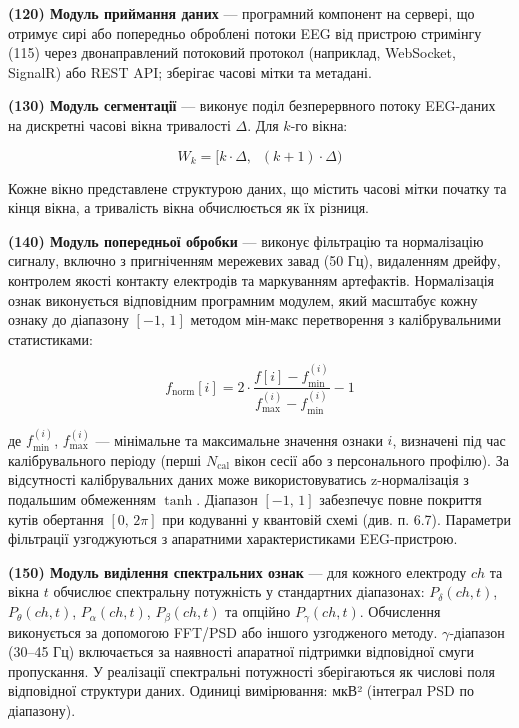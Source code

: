 \documentclass[12pt,a4paper]{article}
\begin{document}
\textbf{(120) Модуль приймання даних} --- програмний компонент на сервері, що отримує сирі або попередньо оброблені потоки EEG від пристрою стримінгу (115) через двонаправлений потоковий протокол (наприклад, WebSocket, SignalR) або REST API; зберігає часові мітки та метадані.



\textbf{(130) Модуль сегментації} --- виконує поділ безперервного потоку EEG-даних на дискретні часові вікна тривалості \(\Delta\). Для \(k\)-го вікна:



\[W_k = \bigl[k \cdot \Delta,\;\;(k+1) \cdot \Delta\bigr)\]



Кожне вікно представлене структурою даних, що містить часові мітки початку та кінця вікна, а тривалість вікна обчислюється як їх різниця.



\textbf{(140) Модуль попередньої обробки} --- виконує фільтрацію та нормалізацію сигналу, включно з пригніченням мережевих завад (50 Гц), видаленням дрейфу, контролем якості контакту електродів та маркуванням артефактів. Нормалізація ознак виконується відповідним програмним модулем, який масштабує кожну ознаку до діапазону \([-1,\,1]\) методом мін-макс перетворення з калібрувальними статистиками:



\[f_{\text{norm}}[i] = 2 \cdot \frac{f[i] - f_{\min}^{(i)}}{f_{\max}^{(i)} - f_{\min}^{(i)}} - 1\]



де \(f_{\min}^{(i)}\), \(f_{\max}^{(i)}\) --- мінімальне та максимальне значення ознаки \(i\), визначені під час калібрувального періоду (перші \(N_{\text{cal}}\) вікон сесії або з персонального профілю). За відсутності калібрувальних даних може використовуватись z-нормалізація з подальшим обмеженням \(\tanh\). Діапазон \([-1,\,1]\) забезпечує повне покриття кутів обертання \([0,\,2\pi]\) при кодуванні у квантовій схемі (див. п. 6.7). Параметри фільтрації узгоджуються з апаратними характеристиками EEG-пристрою.



\textbf{(150) Модуль виділення спектральних ознак} --- для кожного електроду \(ch\) та вікна \(t\) обчислює спектральну потужність у стандартних діапазонах: \(P_\delta(ch,t)\), \(P_\theta(ch,t)\), \(P_\alpha(ch,t)\), \(P_\beta(ch,t)\) та опційно \(P_\gamma(ch,t)\). Обчислення виконується за допомогою FFT/PSD або іншого узгодженого методу. \(\gamma\)-діапазон (30--45 Гц) включається за наявності апаратної підтримки відповідної смуги пропускання. У реалізації спектральні потужності зберігаються як числові поля відповідної структури даних. Одиниці вимірювання: мкВ² (інтеграл PSD по діапазону).
\end{document}
